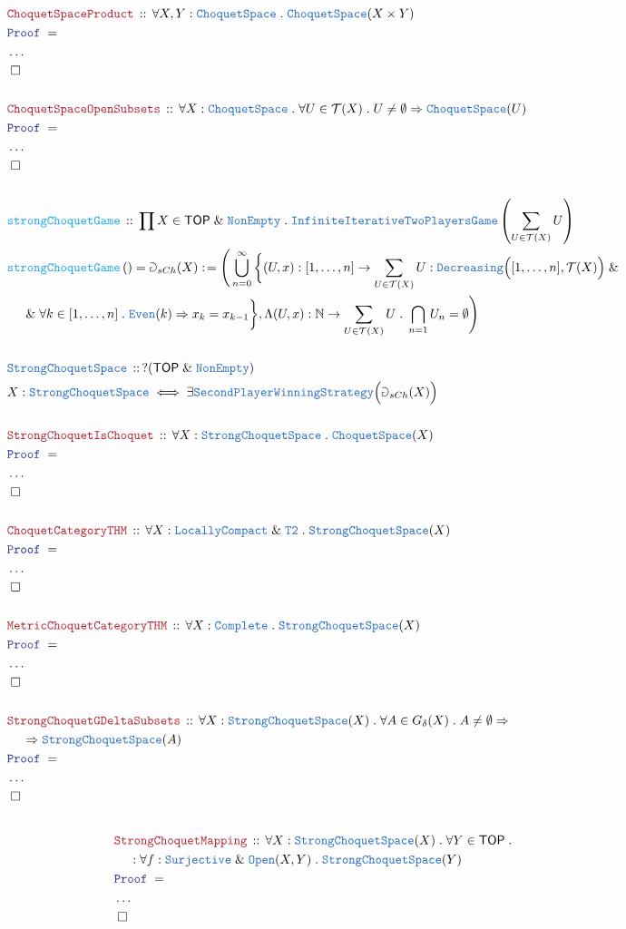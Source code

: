 \documentclass[12pt]{scrartcl}
\newcommand{\TYPE}[1]{\textcolor{NavyBlue}{\mathtt{#1}}}
\newcommand{\FUNC}[1]{\textcolor{Cerulean}{\mathtt{#1}}}
\newcommand{\LOGIC}[1]{\textcolor{Blue}{\mathtt{#1}}}
\newcommand{\THM}[1]{\textcolor{Maroon}{\mathtt{#1}}}
\renewcommand{\.}{\; . \;}
\newcommand{\de}{: \kern 0.1pc =}
\newcommand{\Act}[1]{\left( #1 \right)}
\newcommand{\Theorem}[2]{& \THM{#1} \, :: \, #2 \\ & \Proof = \\ }
\newcommand{\DeclareType}[2]{& \TYPE{#1} \, :: \, #2 \\}
\newcommand{\DefineType}[3]{& #1 : \TYPE{#2} \iff #3 \\}
\newcommand{\DeclareFunc}[2]{& \FUNC{#1} \, :: \, #2 \\}
\newcommand{\DefineNamedFunc}[4]{&  \FUNC{#1}\Act{#2} = #3 \de #4 \\}
\newcommand{\NewLine}{\\ & \kern 1pc}
\newcommand{\Page}[1]{ \begin{align*} #1 \end{align*}   }
\newcommand{\NoProof}{ & \ldots \\ \EndProof}
\renewcommand{\And}{\; \& \;}
\newcommand{\Imply}{\Rightarrow}
\newcommand{\Nat}{\mathbb{N} }
\newcommand{\QED}{\; \square}
\newcommand{\EndProof}{& \QED \\}
\newcommand{\Proof}{\LOGIC{Proof} \; }
\newcommand{\LCompact}{\TYPE{LocallyCompact}}
\newcommand{\TOP}{\mathsf{TOP}}
\newcommand{\T}{\mathcal{T}}
\newcommand{\Complete}{\TYPE{Complete}}
\newcommand{\IIPG}{\TYPE{InfiniteIterativeTwoPlayersGame}}
\newcommand{\SPWS}{\TYPE{SecondPlayerWinningStrategy}}
\newcommand{\CS}{\TYPE{ChoquetSpace}}
\newcommand{\SCS}{\TYPE{StrongChoquetSpace}}
\begin{document}
\Page{
	\Theorem{ChoquetSpaceProduct}
	{
		\forall X,Y : \CS \.
		\CS(X \times Y)
	}
	\NoProof
	\\
	\Theorem{ChoquetSpaceOpenSubsets}
	{
		\forall X : \CS \.
		\forall U \in \T(X) \.
		U \neq \emptyset \Imply
		\CS(U)
	}
	\NoProof
	\\
	\DeclareFunc{strongChoquetGame}
	{
		\prod X \in \TOP \And \TYPE{NonEmpty} \. \IIPG\left( \sum_{U \in \T(X)} U \right)
	}
	\DefineNamedFunc{strongChoquetGame}{}{\Game_{sCh}(X)}
	{
		\Bigg(
			\bigcup_{n=0}^\infty
			\bigg\{
				(U,x) : [1,\ldots, n] \to \sum_{U \in \T(X)} U : 
				\TYPE{Decreasing}\Big( [1,\ldots,n],\T(X) \Big) 
				\And \NewLine \And
				\forall k \in [1,\ldots,n] \. \TYPE{Even}(k) \Imply x_{k} = x_{k-1}
			\bigg\},
			\Lambda (U,x) : \Nat \to \sum_{U \in \T(X)} U \. \bigcap_{n=1} U_n = \emptyset
		\Bigg)
	}
	\\
	\DeclareType{StrongChoquetSpace}{?(\TOP \And \TYPE{NonEmpty}) }
	\DefineType{X}{StrongChoquetSpace}{\exists \SPWS\Big( \Game_{sCh}(X) \Big)}
	\\
	\Theorem{StrongChoquetIsChoquet}
	{
		\forall X : \SCS \. \CS(X)
	}
	\NoProof
	\\
	\Theorem{ChoquetCategoryTHM}{ \forall X : \LCompact \And \TYPE{T2} \. \SCS(X)}
	\NoProof
	\\
	\Theorem{MetricChoquetCategoryTHM}{ \forall X : \Complete \. \SCS(X)}
	\NoProof
	\\
	\Theorem{StrongChoquetGDeltaSubsets}
	{
		\forall X : \SCS(X) \.
		\forall A \in G_\delta(X) \.
		A \neq \emptyset \Imply \NewLine \Imply 
		\SCS(A)
	}
	\NoProof
	\\
}\Page{
	\Theorem{StrongChoquetMapping}
	{
		\forall X : \SCS(X) \.
		\forall Y \in \TOP \.
		\NewLine : 
		\forall f : \TYPE{Surjective} \And \TYPE{Open}(X,Y) \.
		\SCS(Y)
	}
	\NoProof
}
\newpage
\end{document}
